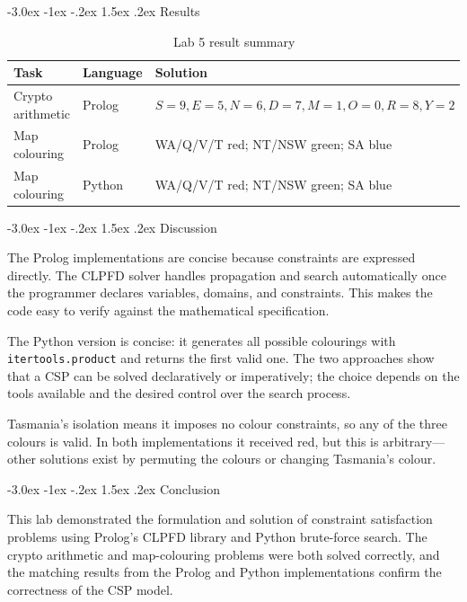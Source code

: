 \documentclass[12pt,a4paper]{article}
\makeatletter
\renewcommand{\section}{\@startsection{section}{1}{\z@}%
  {-3.0ex \@plus -1ex \@minus -.2ex}%
  {1.5ex \@plus.2ex}%
  {\normalfont\Large\bfseries\color{primaryblue}}}
\makeatother
\begin{document}
\section{Results}

\begin{table}[H]
\centering
\caption{Lab 5 result summary}
\begin{tabular}{@{}lll@{}}
\toprule
\textbf{Task} & \textbf{Language} & \textbf{Solution} \\
\midrule
Crypto arithmetic & Prolog & $S=9,E=5,N=6,D=7,M=1,O=0,R=8,Y=2$ \\
Map colouring     & Prolog & WA/Q/V/T red; NT/NSW green; SA blue \\
Map colouring     & Python & WA/Q/V/T red; NT/NSW green; SA blue \\
\bottomrule
\end{tabular}
\end{table}

\section{Discussion}

The Prolog implementations are concise because constraints are expressed directly.  The CLPFD solver handles propagation and search automatically once the programmer declares variables, domains, and constraints.  This makes the code easy to verify against the mathematical specification.

The Python version is concise: it generates all possible colourings with \texttt{itertools.product} and returns the first valid one.  The two approaches show that a CSP can be solved declaratively or imperatively; the choice depends on the tools available and the desired control over the search process.

Tasmania's isolation means it imposes no colour constraints, so any of the three colours is valid.  In both implementations it received red, but this is arbitrary---other solutions exist by permuting the colours or changing Tasmania's colour.

\section{Conclusion}

This lab demonstrated the formulation and solution of constraint satisfaction problems using Prolog's CLPFD library and Python brute-force search.  The crypto arithmetic and map-colouring problems were both solved correctly, and the matching results from the Prolog and Python implementations confirm the correctness of the CSP model.
\end{document}
